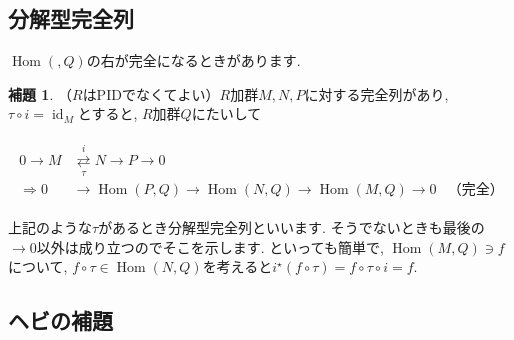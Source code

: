 \documentclass{jsarticle}
\newcommand{\makeop}[1]{\mathop{\mathrm{#1}}\nolimits}
\def\Hom{\makeop{Hom}}
\def\id{\makeop{id}}
\theoremstyle{definition}
\newtheorem{lemma}{補題}
\numberwithin{theorem}{section}
\begin{document}
\subsection{分解型完全列}
$\Hom(, Q)$の右が完全になるときがあります.

\begin{lemma}
（$R$はPIDでなくてよい）$R$加群$M, N, P$に対する完全列があり, $\tau\circ i = \id_M$とすると, $R$加群$Q$にたいして

\begin{eqnarray*}
\begin{aligned}
0 \rightarrow M &\overset{i}{\underset{\tau}{\rightleftarrows}} N \rightarrow P \rightarrow 0\\
\Rightarrow 0 &\rightarrow \Hom(P, Q) \rightarrow \Hom(N, Q) \rightarrow \Hom(M, Q) \rightarrow 0 &（完全）
\end{aligned}
\end{eqnarray*}
\end{lemma}

上記のような$\tau$があるとき分解型完全列といいます. そうでないときも最後の$\rightarrow 0$以外は成り立つのでそこを示します.
といっても簡単で, $\Hom(M, Q) \ni f$について, $f\circ\tau \in \Hom(N, Q)$を考えると$i^\star(f\circ\tau) = f\circ\tau\circ i = f$.

\subsection{ヘビの補題}
\end{document}
